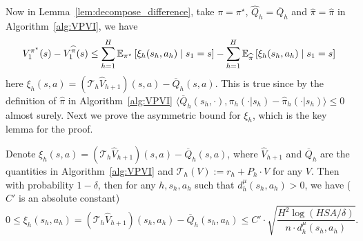 Now in Lemma~\ref{lem:decompose_difference}, take $\pi=\pi^\star$, $\widehat{Q}_h=\overline{Q}_h$ and $\widehat{\pi}=\widehat{\pi}$ in Algorithm~\ref{alg:VPVI}, we have 
\begin{equation}\label{eqn:weak_sub_decomp}
V_1^{\pi^\star}(s)-V_1^{\widehat{\pi}}(s)\leq \sum_{h=1}^H\mathbb{E}_{\pi^\star}\left[\xi_h(s_h,a_h)\mid s_1=s\right]-\sum_{h=1}^H\mathbb{E}_{\widehat{\pi}}\left[\xi_h(s_h,a_h)\mid s_1=s\right]
\end{equation}
here $\xi_h(s,a)=(\mathcal{T}_h\widehat{V}_{h+1})(s,a)-\overline{Q}_h(s,a)$. This is true since by the definition of $\widehat{\pi}$ in Algorithm~\ref{alg:VPVI} $\langle\overline{Q}_{h}\left(s_{h}, \cdot\right), \pi_{h}\left(\cdot | s_{h}\right)-\widehat{\pi}_{h}\left(\cdot | s_{h}\right)\rangle\leq 0$ almost surely. Next we prove the asymmetric bound for $\xi_h$, which is the key lemma for the proof.

\begin{lemma}\label{lem:bellman_diff}
	Denote $\xi_h(s,a)=(\mathcal{T}_h\widehat{V}_{h+1})(s,a)-\overline{Q}_h(s,a)$, where $\widehat{V}_{h+1}$ and  $\overline{Q}_h$ are the quantities in Algorithm~\ref{alg:VPVI} and $\mathcal{T}_h(V):=r_h+P_h\cdot V$ for any $V$. Then with probability $1-\delta$, then for any $h,s_h,a_h$ such that $d^\mu_h(s_h,a_h)>0$, we have ($C'$ is an absolute constant)
	\[
	0\leq \xi_h(s_h,a_h)=(\mathcal{T}_h\widehat{V}_{h+1})(s_h,a_h)-\overline{Q}_h(s_h,a_h)\leq C'\cdot \sqrt{\frac{H^2\log(HSA/\delta)}{n\cdot d^\mu_h(s_h,a_h)}}.
	\]
\end{lemma}

